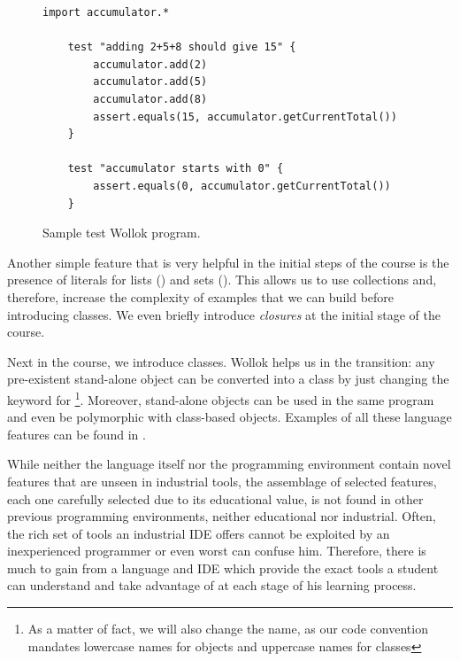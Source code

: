 \vspace{-3mm}
\begin{figure}[ht]
 \centering
 \begin{lstlisting}[language=Wollok]
 	import accumulator.*

	test "adding 2+5+8 should give 15" {
		accumulator.add(2)
		accumulator.add(5)
		accumulator.add(8)
		assert.equals(15, accumulator.getCurrentTotal())		
	}
   
	test "accumulator starts with 0" {
		assert.equals(0, accumulator.getCurrentTotal())
	}\end{lstlisting}
\vspace{-3mm}
\caption{\small Sample test Wollok program.}
\label{fig:test}
\end{figure}
\vspace{-3mm}

Another simple feature that is very helpful in the initial steps of the course is the presence of literals for lists (\eg \code{[1,2,3]}) and sets (\eg {}).
This allows us to use collections and, therefore, increase the complexity of examples that we can build before introducing classes.
We even briefly introduce \emph{closures} at the initial stage of the course.

Next in the course, we introduce classes.
Wollok helps us in the transition: any pre-existent stand-alone object can be converted into a class by just changing the keyword  for %
\footnote{As a matter of fact, we will also change the name, as our code convention mandates lowercase names for objects and uppercase names for classes}.
Moreover, stand-alone objects can be used in the same program and even be polymorphic with class-based objects.
Examples of all these language features can be found in \cite{passerini2017wollok}.

\medskip

While neither the language itself nor the programming environment contain novel features that are unseen in industrial tools,
the assemblage of selected features, each one carefully selected due to its educational value,
is not found in other previous programming environments, neither educational nor industrial.
Often, the rich set of tools an industrial IDE offers cannot be exploited by an inexperienced programmer or even worst can confuse him.
Therefore, there is much to gain from a language and IDE which provide the exact tools 
a student can understand and take advantage of at each stage of his learning process.

